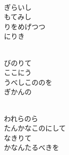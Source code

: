 \documentclass[10pt,b5j]{tarticle} %
\begin{document}
\begin{enumerate}
\begin{minipage}[c]{\blocksize}
    \end{minipage}
    \begin{minipage}[c]{\blocksize}
        
        \vspace{\linespace}
        \item~\\
        ぎらいし\\
        もてみし\\
        りをめげつつ\\
        にりき
        
    \end{minipage}
    \begin{minipage}[c]{\blocksize}
        
        \vspace{\linespace}
        \item~\\
        びのりて\\
        ここにう\\
        うべしこののを\\
        ぎかんの
        
    \end{minipage}
    \begin{minipage}[c]{\blocksize}
        
        \vspace{\linespace}
        \item~\\
        われらのら\\
        たんかなこのにして\\
        なきりて\\
        かなんたるべきを
    
    \end{minipage}
\end{enumerate} %
\end{document}
